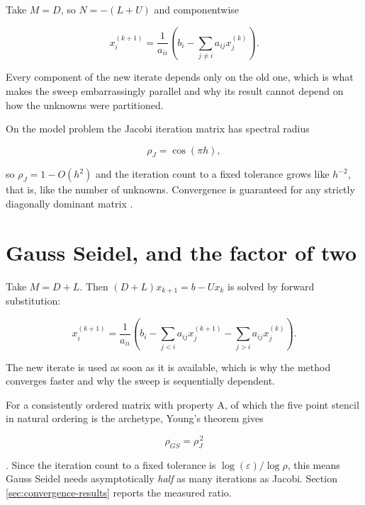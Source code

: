 Take $M = D$, so $N = -(L+U)$ and componentwise

\begin{equation}
  x_i^{(k+1)} = \frac{1}{a_{ii}}\left(b_i - \sum_{j \neq i} a_{ij} x_j^{(k)}\right).
\end{equation}

Every component of the new iterate depends only on the old one, which is what
makes the sweep embarrassingly parallel and why its result cannot depend on how
the unknowns were partitioned.

On the model problem the Jacobi iteration matrix has spectral radius

\begin{equation}
  \rho_J = \cos(\pi h),
  \label{eq:rho-jacobi}
\end{equation}

so $\rho_J = 1 - O(h^2)$ and the iteration count to a fixed tolerance grows like
$h^{-2}$, that is, like the number of unknowns. Convergence is guaranteed for
any strictly diagonally dominant matrix \cite[Thm.~4.9]{saad2003}.

\section{Gauss Seidel, and the factor of two}

Take $M = D + L$. Then $(D+L)x_{k+1} = b - Ux_k$ is solved by forward
substitution:

\begin{equation}
  x_i^{(k+1)} = \frac{1}{a_{ii}}\left(b_i
    - \sum_{j<i} a_{ij} x_j^{(k+1)}
    - \sum_{j>i} a_{ij} x_j^{(k)}\right).
\end{equation}

The new iterate is used as soon as it is available, which is why the method
converges faster and why the sweep is sequentially dependent.

For a consistently ordered matrix with property A, of which the five point
stencil in natural ordering is the archetype, Young's theorem gives

\begin{equation}
  \rho_{GS} = \rho_J^{\,2}
  \label{eq:rho-gs}
\end{equation}

\cite[Thm.~4.3]{young1971}. Since the iteration count to a fixed tolerance is
$\log(\varepsilon)/\log\rho$, this means Gauss Seidel needs asymptotically
\emph{half} as many iterations as Jacobi. Section \ref{sec:convergence-results}
reports the measured ratio.


